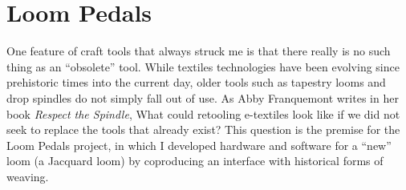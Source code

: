\chapter{Loom Pedals}
\label{ch_loom-pedals}


One feature of craft tools that always struck me is that there really is no such thing as an ``obsolete'' tool. While textiles technologies have been evolving since prehistoric times into the current day, older tools such as tapestry looms and drop spindles do not simply fall out of use. As Abby Franquemont writes in her book \textit{Respect the Spindle},  What could retooling e-textiles look like if we did not seek to replace the tools that already exist? This question is the premise for the Loom Pedals project, in which I developed hardware and software for a ``new'' loom (a Jacquard loom) by coproducing an interface with historical forms of weaving.



